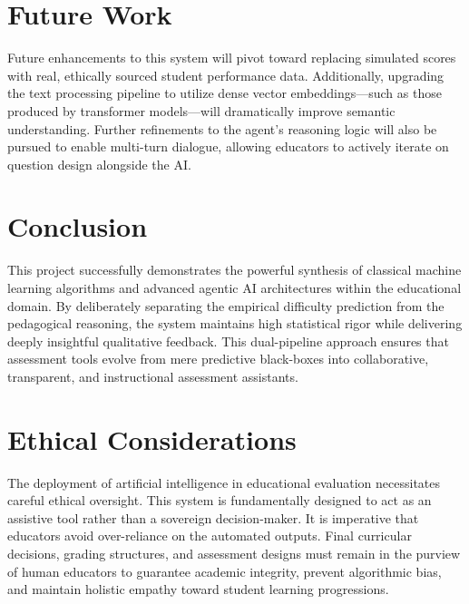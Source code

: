 \documentclass[12pt,a4paper]{article}
\begin{document}
\section{Future Work}
Future enhancements to this system will pivot toward replacing simulated scores with real, ethically sourced student performance data. Additionally, upgrading the text processing pipeline to utilize dense vector embeddings—such as those produced by transformer models—will dramatically improve semantic understanding. Further refinements to the agent's reasoning logic will also be pursued to enable multi-turn dialogue, allowing educators to actively iterate on question design alongside the AI.

\section{Conclusion}
This project successfully demonstrates the powerful synthesis of classical machine learning algorithms and advanced agentic AI architectures within the educational domain. By deliberately separating the empirical difficulty prediction from the pedagogical reasoning, the system maintains high statistical rigor while delivering deeply insightful qualitative feedback. This dual-pipeline approach ensures that assessment tools evolve from mere predictive black-boxes into collaborative, transparent, and instructional assessment assistants.

\section{Ethical Considerations}
The deployment of artificial intelligence in educational evaluation necessitates careful ethical oversight. This system is fundamentally designed to act as an assistive tool rather than a sovereign decision-maker. It is imperative that educators avoid over-reliance on the automated outputs. Final curricular decisions, grading structures, and assessment designs must remain in the purview of human educators to guarantee academic integrity, prevent algorithmic bias, and maintain holistic empathy toward student learning progressions.
\end{document}
